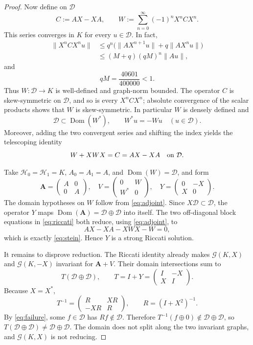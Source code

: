 \documentclass[11pt]{article}
\newcommand{\cD}{\mathcal D}
\newcommand{\cG}{\mathcal G}
\newcommand{\cH}{\mathcal H}
\newcommand{\Dom}{\operatorname{Dom}}
\begin{document}
\begin{proof}
Now define on $\cD$
\[
 C:=AX-XA,
 \qquad
 W:=\sum_{n=0}^{\infty}(-1)^nX^nCX^n.
\]
This series converges in $K$ for every $u\in\cD$.  In fact,
\begin{align*}
 \|X^nCX^nu\|
 &\le q^n\bigl(\|AX^{n+1}u\|+q\|AX^nu\|\bigr)\\
 &\le (M+q)(qM)^n\|Au\|,
\end{align*}
and
\[
 qM=\frac{40601}{400000}<1.
\]
Thus $W:\cD\to K$ is well-defined and graph-norm bounded.  The operator
$C$ is skew-symmetric on $\cD$, and so is every $X^nCX^n$; absolute
convergence of the scalar products shows that $W$ is skew-symmetric.  In
particular $W$ is densely defined and
\begin{equation}\label{eq:adjoint}
 \cD\subset\Dom(W^*),\qquad W^*u=-Wu\quad(u\in\cD).
\end{equation}
Moreover, adding the two convergent series and shifting the index yields the
telescoping identity
\begin{equation}\label{eq:stein}
 W+XWX=C=AX-XA\quad\hbox{on }\cD.
\end{equation}

Take $\cH_0=\cH_1=K$, $A_0=A_1=A$, and $\Dom(W)=\cD$, and form
\[
 \mathbf A=\begin{pmatrix}A&0\\0&A\end{pmatrix},\quad
 V=\begin{pmatrix}0&W\\W^*&0\end{pmatrix},\quad
 Y=\begin{pmatrix}0&-X\\X&0\end{pmatrix}.
\]
The domain hypotheses on $W$ follow from \eqref{eq:adjoint}.  Since
$X\cD\subset\cD$, the operator $Y$ maps
$\Dom(\mathbf A)=\cD\oplus\cD$ into itself.  The two off-diagonal block
equations in \eqref{eq:riccati} both reduce, using \eqref{eq:adjoint}, to
\[
 AX-XA-XWX-W=0,
\]
which is exactly \eqref{eq:stein}.  Hence $Y$ is a strong Riccati solution.

It remains to disprove reduction.  The Riccati identity already makes
$\cG(K,X)$ and $\cG(K,-X)$ invariant for $\mathbf A+V$.  Their domain
intersections sum to
\[
 T(\cD\oplus\cD),\qquad
 T=I+Y=\begin{pmatrix}I&-X\\X&I\end{pmatrix}.
\]
Because $X=X^*$,
\[
 T^{-1}=
 \begin{pmatrix}R&XR\\-XR&R\end{pmatrix},
 \qquad R=(I+X^2)^{-1}.
\]
By \eqref{eq:failure}, some $f\in\cD$ has $Rf\notin\cD$.  Therefore
$T^{-1}(f\oplus0)\notin\cD\oplus\cD$, so
$T(\cD\oplus\cD)\ne\cD\oplus\cD$.  The domain does not split along the
two invariant graphs, and $\cG(K,X)$ is not reducing.
\end{proof}
\end{document}
